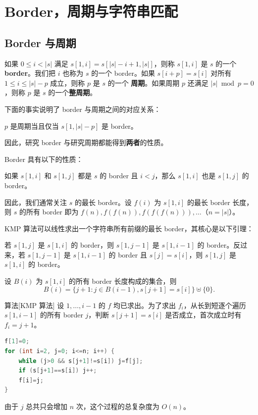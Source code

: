 \chapter{Border，周期与字符串匹配}

\section{Border 与周期}

如果 $0\le i<|s|$ 满足 $s[1,i]=s[|s|-i+1,|s|]$，则称 $s[1,i]$ 是 $s$ 的一个 \textbf{border}。我们把 $i$ 也称为 $s$ 的一个 border。如果 $s[i+p]=s[i]$ 对所有 $1\le i\le |s|-p$ 成立，则称 $p$ 是 $s$ 的一个 \textbf{周期}。如果周期 $p$ 还满足 $|s|\bmod p=0$，则称 $p$ 是 $s$ 的一个\textbf{整周期}。

下面的事实说明了 border 与周期之间的对应关系：
\begin{fact}
    $p$ 是周期当且仅当 $s[1,|s|-p]$ 是 border。
\end{fact}
因此，研究 border 与研究周期都能得到\textbf{两者}的性质。

Border 具有以下的性质：

\begin{lemma}
    如果 $s[1,i]$ 和 $s[1,j]$ 都是 $s$ 的 border 且 $i<j$，那么 $s[1,i]$ 也是 $s[1,j]$ 的 border。
\end{lemma}

因此，我们通常关注 $s$ 的最长 border。设 $f(i)$ 为 $s[1,i]$ 的最长 border 长度，则 $s$ 的所有 border 即为 $f(n),f(f(n)),f(f(f(n))),\ldots$（$n=|s|$）。

KMP 算法可以线性求出一个字符串所有前缀的最长 border，其核心是以下引理：
\begin{lemma}
    若 $s[1,j]$ 是 $s[1,i]$ 的 border，则 $s[1,j-1]$ 是 $s[1,i-1]$ 的 border。反过来，若 $s[1,j-1]$ 是 $s[1,i-1]$ 的 border 且 $s[j]=s[i]$，则 $s[1,j]$ 是 $s[1,i]$ 的 border。
\end{lemma}
\begin{corollary}\label{coro: border recurrence}
    设 $B(i)$ 为 $s[1,i]$ 的所有 border 长度构成的集合，则
    $$
B(i)=\{j+1:j\in B(i-1),s[j+1]=s[i]\}\uplus\{0\}.
    $$
\end{corollary}

\begin{descbox}{算法}[KMP 算法]
    设 $1,\ldots,i-1$ 的 $f$ 均已求出。为了求出 $f_i$，从长到短逐个遍历 $s[1,i-1]$ 的所有 border $j$，判断 $s[j+1]=s[i]$ 是否成立，首次成立时有 $f_i=j+1$。
\end{descbox}
\begin{lstlisting}[language=C++]
f[1]=0;
for (int i=2, j=0; i<=n; i++) {
    while (j>0 && s[j+1]!=s[i]) j=f[j];
    if (s[j+1]==s[i]) j++;
    f[i]=j;
}
\end{lstlisting}
由于 $j$ 总共只会增加 $n$ 次，这个过程的总复杂度为 $O(n)$。

